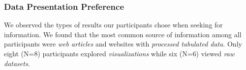 \documentclass{sigchi}
\begin{document}


\subsubsection{Data Presentation Preference}
We observed the types of results our participants chose when seeking for information. We found that the most common source of information among all participants were \textit{web articles} and websites with \textit{processed tabulated data}. Only eight (N=8) participants explored \textit{visualizations} while six (N=6) viewed \textit{raw datasets}.
\end{document}
